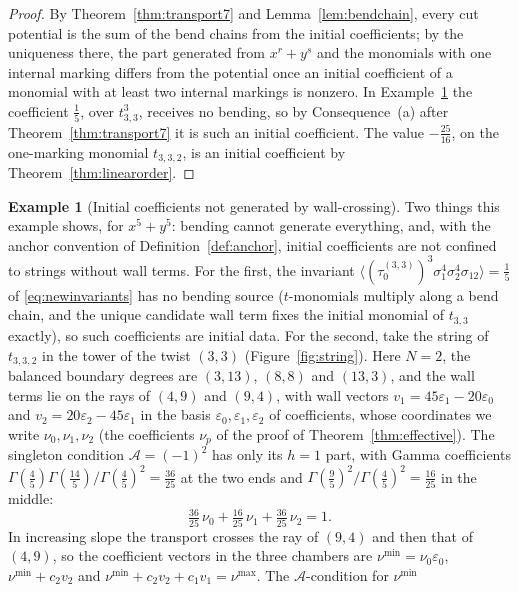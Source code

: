 \documentclass[11pt]{amsart}
\theoremstyle{definition}
\newtheorem{example}[theorem]{Example}
\theoremstyle{remark}
\newcommand{\Ascr}{\mathcal{A}}
\begin{document}
\begin{proof}
By Theorem~\ref{thm:transport7} and Lemma~\ref{lem:bendchain}, every cut
potential is the sum of the bend chains from the initial coefficients; by the
uniqueness there, the part generated from $x^r+y^s$ and the monomials with one
internal marking differs from the potential once an initial coefficient of a
monomial with at least two internal markings is nonzero.  In
Example~\ref{ex:middleseeds} the coefficient $\tfrac15$, over $t_{3,3}^{3}$,
receives no bending,
so by Consequence~(a) after Theorem~\ref{thm:transport7} it is such an initial
coefficient.  The value $-\tfrac{25}{16}$, on the one-marking monomial
$t_{3,3,2}$, is an initial coefficient by Theorem~\ref{thm:linearorder}.
\end{proof}

\begin{example}[Initial coefficients not generated by wall-crossing]
\label{ex:middleseeds}
Two things this example shows, for $x^5+y^5$: bending cannot generate
everything, and, with the anchor convention of Definition~\ref{def:anchor},
initial coefficients are not confined to strings without wall terms. For
the first,
the invariant
$\langle(\tau_{0}^{(3,3)})^{3}\sigma_{1}^{4}\sigma_{2}^{4}\sigma_{12}\rangle
=\tfrac15$ of \eqref{eq:newinvariants} has no bending source ($t$-monomials
multiply along a bend chain, and the unique candidate wall term fixes the
initial monomial of $t_{3,3}$ exactly), so such coefficients are initial data.
For the second, take the string of $t_{3,3,2}$ in the tower of the twist
$(3,3)$ (Figure~\ref{fig:string}).  Here $N=2$, the balanced boundary degrees are $(3,13)$, $(8,8)$ and
$(13,3)$, and the wall terms lie on the rays of $(4,9)$ and $(9,4)$, with wall
vectors $v_1=45\varepsilon_1-20\varepsilon_0$ and
$v_2=20\varepsilon_2-45\varepsilon_1$ in the basis
$\varepsilon_0,\varepsilon_1,\varepsilon_2$ of coefficients, whose coordinates
we write $\nu_0,\nu_1,\nu_2$ (the coefficients $\nu_p$ of the proof of
Theorem~\ref{thm:effective}).  The singleton
condition $\Ascr=(-1)^2$ has only its $h=1$ part, with Gamma coefficients
$\Gamma(\tfrac45)\Gamma(\tfrac{14}5)/\Gamma(\tfrac45)^2=\tfrac{36}{25}$ at the
two ends and $\Gamma(\tfrac95)^2/\Gamma(\tfrac45)^2=\tfrac{16}{25}$ in the
middle:
\[
\tfrac{36}{25}\,\nu_0+\tfrac{16}{25}\,\nu_1+\tfrac{36}{25}\,\nu_2=1 .
\]
In increasing slope the transport crosses the ray of $(9,4)$ and then that of
$(4,9)$, so the coefficient vectors in the three chambers are
$\nu^{\min}=\nu_0\varepsilon_0$, $\nu^{\min}+c_2v_2$ and
$\nu^{\min}+c_2v_2+c_1v_1=\nu^{\max}$.  The $\Ascr$-condition for $\nu^{\min}$

\end{example}
\end{document}
